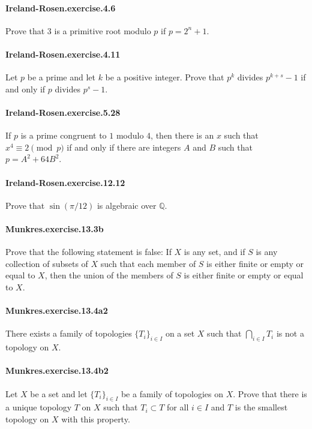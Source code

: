 \documentclass{article}
\begin{document}
\paragraph{Ireland-Rosen.exercise.4.6} Prove that $3$ is a primitive root modulo $p$ if $p=2^n+1$.

\paragraph{Ireland-Rosen.exercise.4.11} Let $p$ be a prime and let $k$ be a positive integer. Prove that $p^k$ divides $p^{k+s}-1$ if and only if $p$ divides $p^s-1$.

\paragraph{Ireland-Rosen.exercise.5.28} If $p$ is a prime congruent to $1$ modulo $4$, then there is an $x$ such that $x^4\equiv 2\pmod{p}$ if and only if there are integers $A$ and $B$ such that $p=A^2+64B^2$.

\paragraph{Ireland-Rosen.exercise.12.12} Prove that $\sin(\pi/12)$ is algebraic over $\mathbb{Q}$.

\paragraph{Munkres.exercise.13.3b} Prove that the following statement is false: If $X$ is any set, and if $S$ is any collection of subsets of $X$ such that each member of $S$ is either finite or empty or equal to $X$, then the union of the members of $S$ is either finite or empty or equal to $X$.

\paragraph{Munkres.exercise.13.4a2} There exists a family of topologies $\{T_i\}_{i\in I}$ on a set $X$ such that $\bigcap_{i\in I} T_i$ is not a topology on $X$.

\paragraph{Munkres.exercise.13.4b2} Let $X$ be a set and let $\{T_i\}_{i\in I}$ be a family of topologies on $X$. Prove that there is a unique topology $T$ on $X$ such that $T_i\subset T$ for all $i\in I$ and $T$ is the smallest topology on $X$ with this property.
\end{document}
